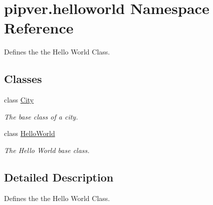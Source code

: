 \hypertarget{namespacepipver_1_1helloworld}{}\section{pipver.\+helloworld Namespace Reference}
\label{namespacepipver_1_1helloworld}


Defines the the Hello World Class.  


\subsection*{Classes}
\begin{DoxyCompactItemize}
\item 
class \hyperlink{classpipver_1_1helloworld_1_1City}{City}
\begin{DoxyCompactList}\small\item\em The base class of a city. \end{DoxyCompactList}\item 
class \hyperlink{classpipver_1_1helloworld_1_1HelloWorld}{Hello\+World}
\begin{DoxyCompactList}\small\item\em The Hello World base class. \end{DoxyCompactList}\end{DoxyCompactItemize}


\subsection{Detailed Description}
Defines the the Hello World Class. 

